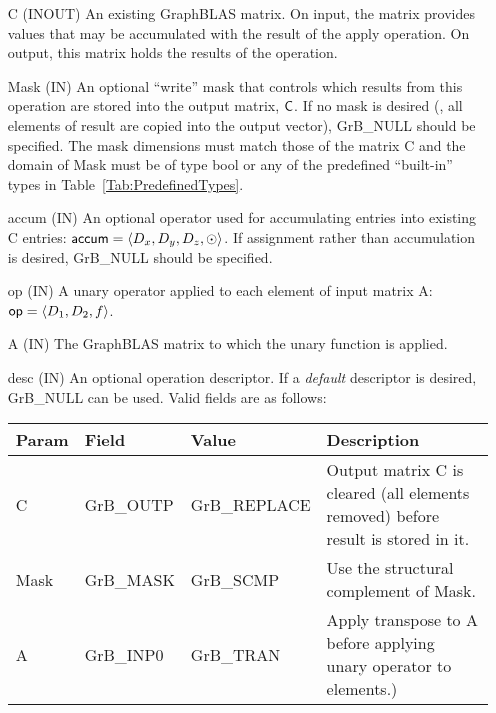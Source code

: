 \begin{itemize}[leftmargin=1in]
    \item[{\sf C}]     ({\sf INOUT}) An existing GraphBLAS matrix.  On input,
    the matrix provides values that may be accumulated with the result of the
    apply operation.  On output, this matrix holds the results of the
    operation.

    \item[{\sf Mask}]  ({\sf IN}) An optional ``write'' mask that controls which
    results from this operation are stored into the output matrix,
    ${\sf C}$.  If no mask is desired (\ie, all elements
    of result are copied into the output vector), {\sf GrB\_NULL}
    should be specified.  The mask dimensions must match those of the
    matrix {\sf C} and the domain of {\sf Mask} must be
    of type {\sf bool} or any of the predefined ``built-in'' types in
    Table~\ref{Tab:PredefinedTypes}.

    \item[{\sf accum}] ({\sf IN})  An optional operator used for accumulating
    entries into existing {\sf C} entries: ${\sf accum} = \langle D_x,
    D_y, D_z,\odot \rangle$. If assignment rather than accumulation is
    desired, {\sf GrB\_NULL} should be specified.

    \item[{\sf op}] ({\sf IN}) A unary operator applied to each
	    element of input matrix {\sf A}: ${\sf op} = \langle D_1, D_2, f \rangle$.

    \item[{\sf A}]     ({\sf IN})  The GraphBLAS matrix to which the unary function 
    is applied.

    \item[{\sf desc}]  ({\sf IN}) An optional operation descriptor.  If a 
    \emph{default} descriptor is desired, {\sf GrB\_NULL} can be used.  Valid 
    fields are as follows: \\
    
    \begin{tabular}{lllp{2.5in}}
        Param & Field  & Value & Description \\
        \hline
        {\sf C}    & {\sf GrB\_OUTP} & {\sf GrB\_REPLACE} & Output matrix {\sf C} 
        is cleared (all elements removed) before result is stored in it. \\
    
        {\sf Mask} & {\sf GrB\_MASK} & {\sf GrB\_SCMP}   & Use the structural 
        complement of {\sf Mask}. \\
    
        {\sf A}    & {\sf GrB\_INP0} & {\sf GrB\_TRAN}   & Apply transpose to {\sf A} 
        before applying unary operator to elements.) \\
    \end{tabular}
\end{itemize}

